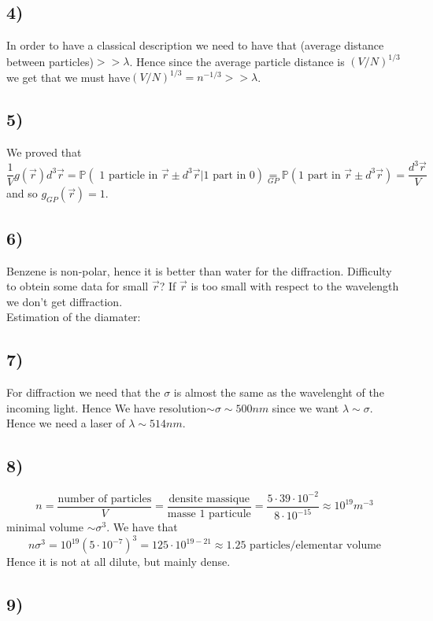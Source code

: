 \documentclass[10pt,a4paper]{book}
\begin{document}
\subsection*{4)}
In order to have a classical description we need to have that (average distance between particles)$>>\lambda$. Hence since the average particle distance is $(V/N)^{1/3}$ we get that we must have$(V/N)^{1/3}=n^{-1/3}>>\lambda$.


\subsection*{5)}
We proved that 
$$\frac{1}{V}g(\vec{r})d^3\vec{r}=\mathbb{P}(\text{ 1 particle in }\vec{r}\pm d^3\vec{r}|\text{1 part in 0})\underset{GP}{=}\mathbb{P}(\text{1 part in }\vec{r}\pm d^3\vec{r})=\frac{d^3\vec{r}}{V}$$
and so $g_{GP}(\vec{r})=1$. 

\subsection*{6)}
Benzene is non-polar, hence it is better than water for the diffraction. Difficulty to obtein some data for small $\vec{r}$? If $\vec{ r}$ is too small with respect to the wavelength we don't get diffraction.\\
Estimation of the diamater:



\subsection*{7)}
For diffraction we need that the $\sigma$ is almost the same as the wavelenght of the incoming light. Hence We have resolution$\sim\sigma\sim 500nm$ since we want $\lambda\sim\sigma$. Hence we need a laser of $\lambda \sim 514  nm$.


\subsection*{8)}

$$n=\frac{\text{number of particles}}{V}=\frac{\text{densite massique}}{\text{masse 1 particule}}=\frac{5\cdot 39\cdot 10^{-2}}{8\cdot 10^{-15}}\approx 10^{19}m^{-3}$$
minimal volume $\sim\sigma^3$.
We have that
$$n\sigma^3=10^{19}(5\cdot 10^{-7})^3=125\cdot 10^{19-21}\approx 1.25\text{ particles/elementar volume}$$
Hence it is not at all dilute, but mainly dense.

\subsection*{9)}
\end{document}
